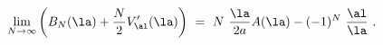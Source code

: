 \begin{equation}
\lim_{N\to\infty}
\left(B_N(\la) + \frac{N}{2}V_{\al}'(\la)\right) \ =\
N\ \frac{\la}{2a}A(\la)-(-1)^N\
            \frac{\al}{\la} \ .
\label{ABlim}
\end{equation}

